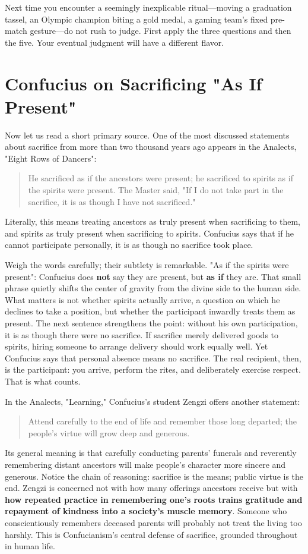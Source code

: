Next time you encounter a seemingly inexplicable ritual---moving a graduation tassel, an Olympic champion biting a gold medal, a gaming team's fixed pre-match gesture---do not rush to judge. First apply the three questions and then the five. Your eventual judgment will have a different flavor.

\section{Confucius on Sacrificing "As If Present"}
Now let us read a short primary source. One of the most discussed statements about sacrifice from more than two thousand years ago appears in the Analects, "Eight Rows of Dancers":

\begin{quote}
He sacrificed as if the ancestors were present; he sacrificed to spirits as if the spirits were present. The Master said, "If I do not take part in the sacrifice, it is as though I have not sacrificed."
\end{quote}
Literally, this means treating ancestors as truly present when sacrificing to them, and spirits as truly present when sacrificing to spirits. Confucius says that if he cannot participate personally, it is as though no sacrifice took place.

Weigh the words carefully; their subtlety is remarkable. "As if the spirits were present": Confucius does \textbf{not} say they are present, but \textbf{as if} they are. That small phrase quietly shifts the center of gravity from the divine side to the human side. What matters is not whether spirits actually arrive, a question on which he declines to take a position, but whether the participant inwardly treats them as present. The next sentence strengthens the point: without his own participation, it is as though there were no sacrifice. If sacrifice merely delivered goods to spirits, hiring someone to arrange delivery should work equally well. Yet Confucius says that personal absence means no sacrifice. The real recipient, then, is the participant: you arrive, perform the rites, and deliberately exercise respect. That is what counts.

In the Analects, "Learning," Confucius's student Zengzi offers another statement:

\begin{quote}
Attend carefully to the end of life and remember those long departed; the people's virtue will grow deep and generous.
\end{quote}
Its general meaning is that carefully conducting parents' funerals and reverently remembering distant ancestors will make people's character more sincere and generous. Notice the chain of reasoning: sacrifice is the means; public virtue is the end. Zengzi is concerned not with how many offerings ancestors receive but with \textbf{how repeated practice in remembering one's roots trains gratitude and repayment of kindness into a society's muscle memory}. Someone who conscientiously remembers deceased parents will probably not treat the living too harshly. This is Confucianism's central defense of sacrifice, grounded throughout in human life.

